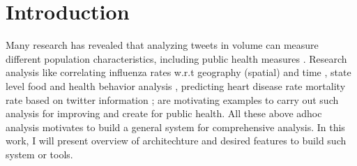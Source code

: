 \section*{Introduction}
\label{sec:intro}
Many research has revealed that analyzing tweets in volume can measure different population characteristics, including public
health measures \cite{paul2011you, paul2012model, eichstaedt2015psychological, barros2018disease, mueller2018crowdbreaks, karami2018characterizing}.
Research analysis like correlating influenza rates w.r.t geography (spatial) and time \cite{signorini2011use}, state level food and health behavior analysis \cite{nguyen2017social}, predicting heart disease rate mortality rate based on twitter information \cite{eichstaedt2015psychological}; are motivating examples to carry out such analysis for improving and create for public health.
All these above adhoc analysis motivates to build a general system for comprehensive analysis.
In this work, I will present overview of architechture and desired features to build such system or tools.




